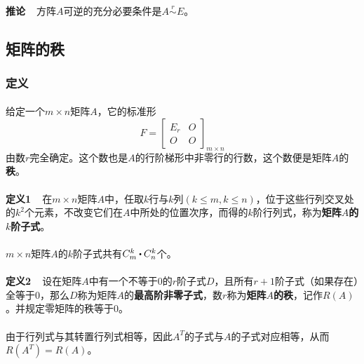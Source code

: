 \paragraph{}
\textbf{推论~~}方阵$A$可逆的充分必要条件是$A\overset{r}{\sim}E$。

\subsection{矩阵的秩}
\subsubsection{定义}
\paragraph{}
给定一个$m\times n$矩阵$A$，它的标准形
\begin{equation*}
  F = \left[\begin{array}{cc}
    E_r & O \\
    O & O
  \end{array}\right]_{m\times n}
\end{equation*}
由数$r$完全确定。这个数也是$A$的行阶梯形中非零行的行数，这个数便是矩阵$A$的\textbf{秩}。

\paragraph{}
\textbf{定义1~~}在$m\times n$矩阵$A$中，任取$k$行与$k$列$(k \leq m, k \leq n)$，位于这些行列交叉处的$k^2$个元素，不改变它们在$A$中所处的位置次序，而得的$k$阶行列式，称为\textbf{矩阵$A$的$k$阶子式}。

\paragraph{}
$m\times n$矩阵$A$的$k$阶子式共有$C_m^k\bigcdot C_n^k$个。

\paragraph{}
\textbf{定义2~~}设在矩阵$A$中有一个不等于$0$的$r$阶子式$D$，且所有$r+1$阶子式（如果存在）全等于$0$，那么$D$称为矩阵$A$的\textbf{最高阶非零子式}，数$r$称为\textbf{矩阵$A$的秩}，记作$R(A)$。并规定零矩阵的秩等于$0$。

\paragraph{}
由于行列式与其转置行列式相等，因此$A^T$的子式与$A$的子式对应相等，从而$R(A^T)=R(A)$。

